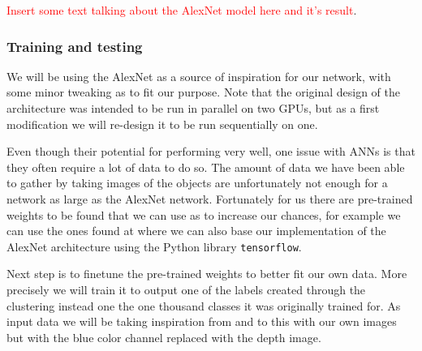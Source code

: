 \textcolor{red}{Insert some text talking about the AlexNet model here and it's result}.

\subsubsection{Training and testing}

We will be using the AlexNet as a source of inspiration for our network, with some minor tweaking as to fit our purpose. Note that the original design of the architecture was intended to be run in parallel on two GPUs, but as a first modification we will re-design it to be run sequentially on one.

Even though their potential for performing very well, one issue with ANNs is that they often require a lot of data to do so. The amount of data we have been able to gather by taking images of the objects are unfortunately not enough for a network as large as the AlexNet network. Fortunately for us there are pre-trained weights to be found that we can use as to increase our chances, for example we can use the ones found at \parencite{AlexNetImplWeights} where we can also base our implementation of the AlexNet architecture using the Python library \texttt{tensorflow}.

Next step is to finetune the pre-trained weights to better fit our own data. More precisely we will train it to output one of the labels created through the clustering instead one the one thousand classes it was originally trained for. As input data we will be taking inspiration from \parencite{Redmon2014} and to this with our own images but with the blue color channel replaced with the depth image.
